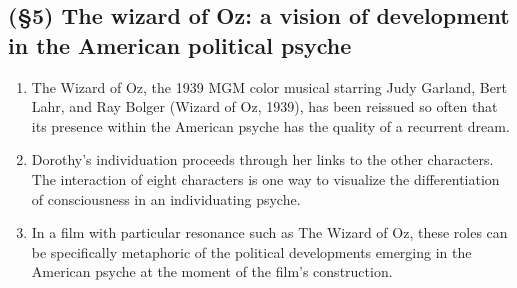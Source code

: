 \subsection{(\S5) The wizard of Oz: a vision of development in the American political psyche}

\begin{enumerate}

\item {} The Wizard
of Oz, the 1939 MGM color musical starring Judy Garland, Bert Lahr, and Ray
Bolger (Wizard of Oz, 1939), has been reissued so often that its presence
within the American psyche has the quality of a recurrent dream.

\item {}
Dorothy's individuation proceeds through her links to the other characters.
The interaction of eight characters is one way to visualize the differentiation
of consciousness in an individuating psyche.

\item {} In a film with particular resonance
such as The Wizard of Oz, these roles can be specifically metaphoric of the
political developments emerging in the American psyche at the moment of the
film's construction.

\end{enumerate}
